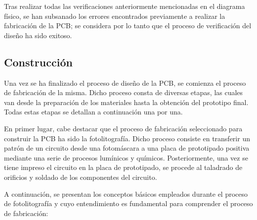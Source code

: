 Tras realizar todas las verificaciones anteriormente mencionadas en el diagrama físico, se han subsanado los errores encontrados previamente a realizar la fabricación de la \ac{PCB}; se considera por lo tanto que el proceso de verificación del diseño ha sido exitoso.

\subsection{Construcción}

Una vez se ha finalizado el proceso de diseño de la \ac{PCB}, se comienza el proceso de fabricación de la misma. Dicho proceso consta de diversas etapas, las cuales van desde la preparación de los materiales hasta la obtención del prototipo final. Todas estas etapas se detallan a continuación una por una.

En primer lugar, cabe destacar que el proceso de fabricación seleccionado para construir la \ac{PCB} ha sido la fotolitografía. Dicho proceso consiste en transferir un patrón de un circuito desde una fotomáscara a una placa de prototipado positiva mediante una serie de procesos lumínicos y químicos. Posteriormente, una vez se tiene impreso el circuito en la placa de prototipado, se procede al taladrado de orificios y soldado de los componentes del circuito.

A continuación, se presentan los conceptos básicos empleados durante el proceso de fotolitografía y cuyo entendimiento es fundamental para comprender el proceso de fabricación:

